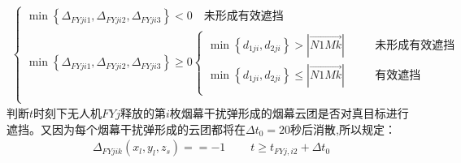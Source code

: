 \documentclass[../main.tex]{subfiles}
\begin{document}
\begin{itemize}
\begin{align}\label{1.88}
	\left\{ \begin{array}{l}
	\min \left\{ \Delta _{FYji1},\Delta _{FYji2},\Delta _{FYji3} \right\} <0\,\,\,\,\,\,\text{未形成有效遮挡}\\
	\min \left\{ \Delta _{FYji1},\Delta _{FYji2},\Delta _{FYji3} \right\} \ge 0\left\{ \begin{array}{l}
	\min \left\{ d_{1ji},d_{2ji} \right\} >\left| \overrightarrow{N1Mk} \right|\,\,\,\,\,\,\,\,\,\,\,\,\,\,\,\,\text{未形成有效遮挡}\\
	\min \left\{ d_{1ji},d_{2ji} \right\} \le \left| \overrightarrow{N1Mk} \right|\,\,\,\,\,\,\,\,\,\,\,\,\,\,\,\,\text{有效遮挡}\\
\end{array} \right.\\
\end{array} \right. 
\end{align}
判断$t$时刻下无人机$FYj$释放的第$i$枚烟幕干扰弹形成的烟幕云团是否对真目标进行遮挡。又因为每个烟幕干扰弹形成的云团都将在$\Delta t_0 = 20$秒后消散,所以规定： 
\begin{align}\label{14.907}
	\Delta _{FYjik}\left( x_l,y_l,z_s \right) =
	=-1\ \ \ \ \ \ \ \ \ \ t\ge t_{FYj,i2}+\Delta t_0\\
\end{align}
\end{itemize}
\end{document}
